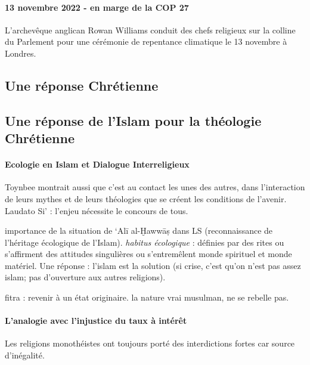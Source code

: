 \paragraph{13 novembre 2022 - en marge de la COP 27}
L’archevêque anglican Rowan Williams conduit des chefs religieux sur la colline du Parlement pour une cérémonie de repentance climatique le 13 novembre à Londres.  
 
\subsection{Une réponse Chrétienne}

\subsection{Une réponse de l'Islam pour la théologie Chrétienne}

\paragraph{Ecologie en Islam et Dialogue Interreligieux} \cite{pisani_ecologie_2016} 
    Toynbee montrait aussi que c’est au contact les unes des autres, dans l’interaction de leurs mythes et de leurs théologies que se créent les conditions de l’avenir.
    Laudato Si’ : l'enjeu nécessite le concours de tous.
   
    importance de la situation de ‘Alī al-Ḫawwāṣ dans LS (reconnaissance de l'héritage écologique de l'Islam).     
    \textit{habitus écologique} : définies par des rites ou s'affirment des attitudes singulières ou s'entremêlent monde spirituel et monde matériel. 
    Une réponse : l’islam est la solution (si crise, c'est qu'on n'est pas assez islam; pas d'ouverture aux autres religions).
    
    fitra : revenir à un état originaire. la nature vrai musulman, ne se rebelle pas.
    


 
\paragraph{L'analogie avec l'injustice du taux à intérêt} Les religions monothéistes ont toujours porté des interdictions fortes car source d'inégalité. 
  
